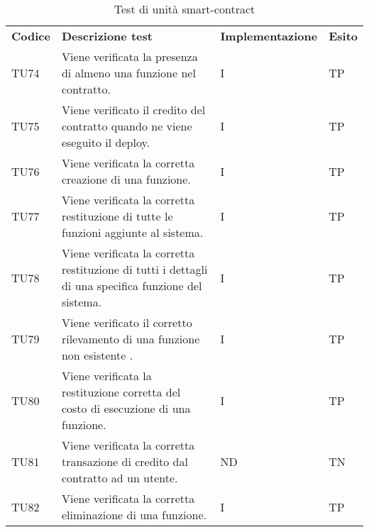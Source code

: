 \renewcommand{\arraystretch}{1.5}
\begin{longtable}{|C{1.5cm}|C{8cm}|C{3cm}|C{1cm}|}

	\caption{Test di unità smart-contract}\\
	\hline

	\textbf{Codice} & \textbf{Descrizione test}  &\textbf{Implementazione}& \textbf{Esito}
	\tabularnewline
	\endfirsthead

	TU74 &
	Viene verificata la presenza di almeno una funzione nel contratto.  &
	I & TP\\

	TU75 &
	Viene verificato il credito del contratto quando ne viene eseguito il deploy.  &
	I & TP\\

	TU76 &
	Viene verificata la corretta creazione di una funzione.  &
	I & TP\\

	TU77 &
	Viene verificata la corretta restituzione di tutte le funzioni aggiunte al sistema.  &
	I & TP\\

	TU78 &
	Viene verificata la corretta restituzione di tutti i dettagli di una specifica funzione del sistema.  &
	I & TP\\

	TU79 &
	Viene verificato il corretto rilevamento di una funzione non esistente .  &
	I & TP\\


	TU80 &
	Viene verificata la restituzione corretta del costo  di esecuzione di una funzione.  &
	I & TP\\



	TU81 &
	Viene verificata la corretta transazione di credito dal contratto ad un utente.  &
	ND  & TN \\

	TU82 &
	Viene verificata la corretta eliminazione di una funzione.  &
	I & TP\\


\end{longtable}
